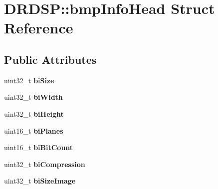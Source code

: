 \hypertarget{struct_d_r_d_s_p_1_1bmp_info_head}{\section{D\-R\-D\-S\-P\-:\-:bmp\-Info\-Head Struct Reference}
\label{struct_d_r_d_s_p_1_1bmp_info_head}
}
\subsection*{Public Attributes}
\begin{DoxyCompactItemize}
\item 
\hypertarget{struct_d_r_d_s_p_1_1bmp_info_head_a5482c0abae0db8fb22d7a53b81fdcfe2}{uint32\-\_\-t {\bfseries bi\-Size}}\label{struct_d_r_d_s_p_1_1bmp_info_head_a5482c0abae0db8fb22d7a53b81fdcfe2}

\item 
\hypertarget{struct_d_r_d_s_p_1_1bmp_info_head_a94c30fc2a1de015e6c7a3d064a8df873}{uint32\-\_\-t {\bfseries bi\-Width}}\label{struct_d_r_d_s_p_1_1bmp_info_head_a94c30fc2a1de015e6c7a3d064a8df873}

\item 
\hypertarget{struct_d_r_d_s_p_1_1bmp_info_head_a0edcbe7ef8a2e25c462c11aef1b7c3c4}{uint32\-\_\-t {\bfseries bi\-Height}}\label{struct_d_r_d_s_p_1_1bmp_info_head_a0edcbe7ef8a2e25c462c11aef1b7c3c4}

\item 
\hypertarget{struct_d_r_d_s_p_1_1bmp_info_head_ad0d931d91d6bffa53f819d2531ec5aef}{uint16\-\_\-t {\bfseries bi\-Planes}}\label{struct_d_r_d_s_p_1_1bmp_info_head_ad0d931d91d6bffa53f819d2531ec5aef}

\item 
\hypertarget{struct_d_r_d_s_p_1_1bmp_info_head_a2c2d208dbc1810470d35a0120da66a30}{uint16\-\_\-t {\bfseries bi\-Bit\-Count}}\label{struct_d_r_d_s_p_1_1bmp_info_head_a2c2d208dbc1810470d35a0120da66a30}

\item 
\hypertarget{struct_d_r_d_s_p_1_1bmp_info_head_a433f22d78fb0616fd6d90bbc74f0c997}{uint32\-\_\-t {\bfseries bi\-Compression}}\label{struct_d_r_d_s_p_1_1bmp_info_head_a433f22d78fb0616fd6d90bbc74f0c997}

\item 
\hypertarget{struct_d_r_d_s_p_1_1bmp_info_head_a2f0bd18c9e535736ec4874ca39e6e434}{uint32\-\_\-t {\bfseries bi\-Size\-Image}}\label{struct_d_r_d_s_p_1_1bmp_info_head_a2f0bd18c9e535736ec4874ca39e6e434}


\end{DoxyCompactItemize}
